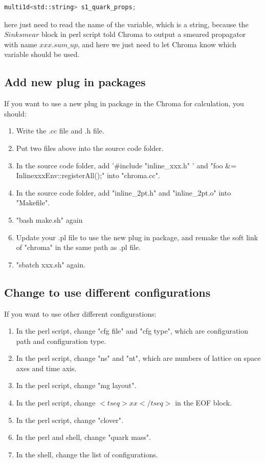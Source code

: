 \documentclass{article}
\begin{document}
\begin{lstlisting}[language=Python]
    multi1d<std::string> s1_quark_props; 
\end{lstlisting}

here just need to read the name of the variable, which is a string, because the $Sink smear$ block in perl script told Chroma to output a smeared propagator with name $xxx.sum\_up$, and here we just need to let Chroma know which variable should be used.

\subsection{Add new plug in packages}

If you want to use a new plug in package in the Chroma for calculation, you should:

\begin{enumerate}
    \item Write the .cc file and .h file.
    \item Put two files above into the source code folder.
    \item In the source code folder, add '\#include "inline\_xxx.h" ' and "foo \&= InlinexxxEnv::registerAll();" into "chroma.cc".
    \item In the source code folder, add "inline\_2pt.h" and "inline\_2pt.o" into "Makefile".
    \item "bash make.sh" again
    \item Update your .pl file to use the new plug in package, and remake the soft link of "chroma" in the same path as .pl file.
    \item "sbatch xxx.sh" again.
\end{enumerate}


\subsection{Change to use different configurations}

If you want to use other different configurations:

\begin{enumerate}
  \item In the perl script, change "cfg file" and "cfg type", which are configuration path and configuration type.
  \item In the perl script, change "ns" and "nt", which are numbers of lattice on space axes and time axis.
  \item In the perl script, change "mg layout".
  \item In the perl script, change $<tseq>xx</tseq>$ in the EOF block.
  \item In the perl script, change "clover".
  \item In the perl and shell, change "quark mass".
  \item In the shell, change the list of configurations. 
\end{enumerate}
\end{document}
